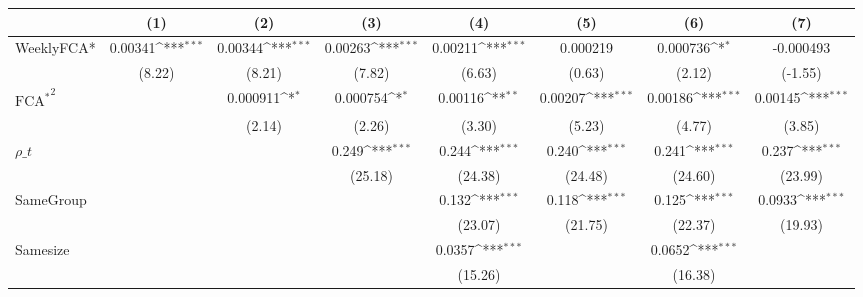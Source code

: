 {
\def\sym#1{\ifmmode^{#1}\else\(^{#1}\)\fi}
\begin{tabular}{l*{7}{c}}
\hline\hline
                    &\multicolumn{1}{c}{(1)}         &\multicolumn{1}{c}{(2)}         &\multicolumn{1}{c}{(3)}         &\multicolumn{1}{c}{(4)}         &\multicolumn{1}{c}{(5)}         &\multicolumn{1}{c}{(6)}         &\multicolumn{1}{c}{(7)}         \\
\hline
WeeklyFCA*          &     0.00341\sym{***}&     0.00344\sym{***}&     0.00263\sym{***}&     0.00211\sym{***}&    0.000219         &    0.000736\sym{*}  &   -0.000493         \\
                    &      (8.22)         &      (8.21)         &      (7.82)         &      (6.63)         &      (0.63)         &      (2.12)         &     (-1.55)         \\
[1em]
 $ { \text{FCA} ^ * } ^2 $&                     &    0.000911\sym{*}  &    0.000754\sym{*}  &     0.00116\sym{**} &     0.00207\sym{***}&     0.00186\sym{***}&     0.00145\sym{***}\\
                    &                     &      (2.14)         &      (2.26)         &      (3.30)         &      (5.23)         &      (4.77)         &      (3.85)         \\
[1em]
$ \rho\_t $          &                     &                     &       0.249\sym{***}&       0.244\sym{***}&       0.240\sym{***}&       0.241\sym{***}&       0.237\sym{***}\\
                    &                     &                     &     (25.18)         &     (24.38)         &     (24.48)         &     (24.60)         &     (23.99)         \\
[1em]
SameGroup           &                     &                     &                     &       0.132\sym{***}&       0.118\sym{***}&       0.125\sym{***}&      0.0933\sym{***}\\
                    &                     &                     &                     &     (23.07)         &     (21.75)         &     (22.37)         &     (19.93)         \\
[1em]
Samesize            &                     &                     &                     &      0.0357\sym{***}&                     &      0.0652\sym{***}&                     \\
                    &                     &                     &                     &     (15.26)         &                     &     (16.38)         &                     \\

\end{tabular}}

